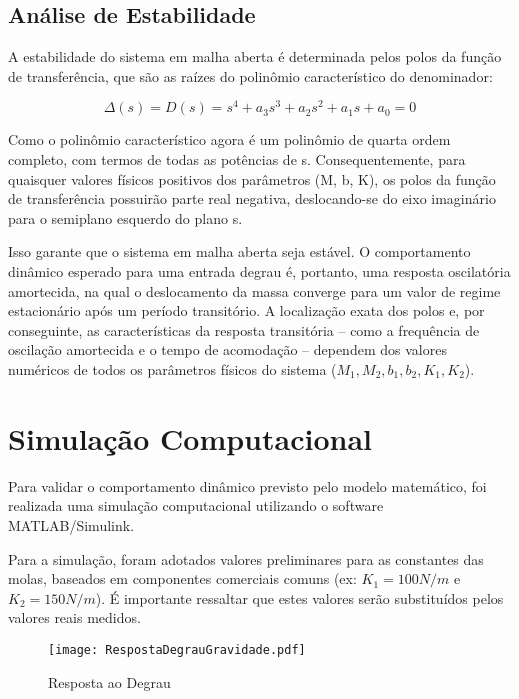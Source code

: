 \documentclass[9pt,a4paper,twocolumn,twoside]{tau-class/tau}
\begin{document}
\subsection{Análise de Estabilidade}

A estabilidade do sistema em malha aberta é determinada pelos polos da função de transferência, que são as raízes do polinômio característico do denominador:

\begin{equation}
    \Delta (s) = D(s) = s^4 + a_3s^3 + a_2s^2 + a_1s + a_0 = 0
\label{eq:raizes}
\end{equation}

Como o polinômio característico agora é um polinômio de quarta ordem completo, com termos de todas as potências de s. Consequentemente, para quaisquer valores físicos positivos dos parâmetros (M, b, K), os polos da função de transferência possuirão parte real negativa, deslocando-se do eixo imaginário para o semiplano esquerdo do plano s.

Isso garante que o sistema em malha aberta seja estável. O comportamento dinâmico esperado para uma entrada degrau é, portanto, uma resposta oscilatória amortecida, na qual o deslocamento da massa converge para um valor de regime estacionário após um período transitório. A localização exata dos polos e, por conseguinte, as características da resposta transitória -- como a frequência de oscilação amortecida e o tempo de acomodação -- dependem dos valores numéricos de todos os parâmetros físicos do sistema ($M_1, M_2, b_1, b_2, K_1, K_2$).

\section{Simulação Computacional}

Para validar o comportamento dinâmico previsto pelo modelo matemático, foi realizada uma simulação computacional utilizando o software MATLAB/Simulink.

Para a simulação, foram adotados valores preliminares para as constantes das molas, baseados em componentes comerciais comuns (ex: $K_1 = 100N/m$ e $K_2 = 150N/m$). É importante ressaltar que estes valores serão substituídos pelos valores reais medidos.

\begin{figure}[H]
    \centering
    \texttt{[image: RespostaDegrauGravidade.pdf]}
    \caption{Resposta ao Degrau}
    \label{fig:RDG}
\end{figure}
\end{document}
